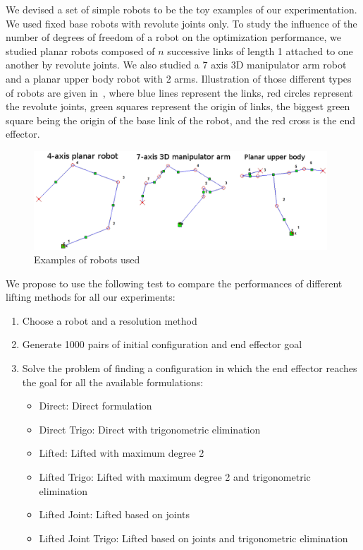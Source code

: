 We devised a set of simple robots to be the toy examples of our experimentation.
We used fixed base robots with revolute joints only.
To study the influence of the number of degrees of freedom of a robot on the optimization performance, we studied planar robots composed of $n$ successive links of length 1 attached to one another by revolute joints.
We also studied a 7 axis 3D manipulator arm robot and a planar upper body robot with 2 arms.
Illustration of those different types of robots are given in~, where blue lines represent the links, red circles represent the revolute joints, green squares represent the origin of links, the biggest green square being the origin of the base link of the robot, and the red cross is the end effector.
\begin{figure}
  \centering
  \includegraphics[width=0.98\textwidth]{robots.png}
  \caption{Examples of robots used}
\label{fig:robots}
\end{figure}

We propose to use the following test to compare the performances of different lifting methods for all our experiments:
\begin{enumerate}
  \item Choose a robot and a resolution method
  \item Generate 1000 pairs of initial configuration and end effector goal
  \item Solve the problem of finding a configuration in which the end effector reaches the goal for all the available formulations:
  \begin{itemize}
    \item Direct: Direct formulation
    \item Direct Trigo: Direct with trigonometric elimination
    \item Lifted: Lifted with maximum degree 2
    \item Lifted Trigo: Lifted with maximum degree 2 and trigonometric elimination
    \item Lifted Joint: Lifted based on joints
    \item Lifted Joint Trigo: Lifted based on joints and trigonometric elimination
  \end{itemize}
\end{enumerate}

